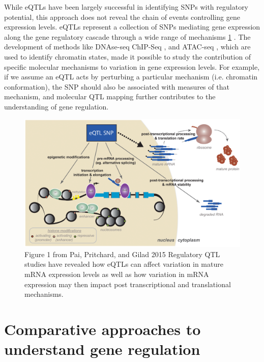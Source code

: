 While eQTLs have been largely successful in identifying SNPs with regulatory potential, this approach does not reveal the chain of events controlling gene expression levels. eQTLs represent a collection of SNPs mediating gene expression along the gene regulatory cascade through a wide range of mechanisms \ref{fig:eQTLMech} \citep{Pai2015}. The development of methods like DNAse-seq \citep{song_dnase-seq_2010} ChIP-Seq \cite{barski_high-resolution_2007}, and ATAC-seq \citep{buenrostro_atac-seq_2015}, which are used to identify chromatin states, made it possible to study the contribution of specific molecular mechanisms to variation in gene expression levels. For example, if we assume an eQTL acts by perturbing a particular mechanism (i.e. chromatin conformation), the SNP should also be associated with measures of that mechanism, and molecular QTL mapping further contributes to the understanding of gene regulation. 


\begin{figure}
\centering
\includegraphics[width=5in]{img/ch01/eQTLMech.png}
\caption[Potential mechanisms for eQTLs]{Figure 1 from Pai, Pritchard, and Gilad 2015 \citep{Pai2015} Regulatory QTL studies have revealed how eQTLs can affect variation in mature mRNA expression levels as well as how variation in mRNA expression may then impact post transcriptional and translational mechanisms.} 
\label{fig:eQTLMech}
\end{figure}

\section{Comparative approaches to understand gene regulation}

